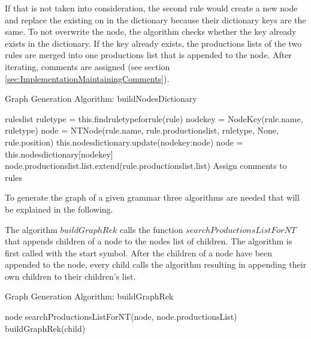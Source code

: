 If that is not taken into consideration, the second rule would create a new node and replace the existing on in the dictionary because their dictionary keys are the same. To not overwrite the node, the algorithm checks whether the key already exists in the dictionary. If the key already exists, the productions lists of the two rules are merged into one productions list that is appended to the node. 
After iterating, comments are assigned (see section \ref{sec:ImplementationMaintainingComments}).

\begin{algorithm}[H]
\caption{Graph Generation Algorithm: buildNodesDictionary}\label{alg:buildNodesDictionary}
\begin{algorithmic}[1] 
\Require rules\textunderscore list
		\State rule\textunderscore type = this.find\textunderscore rule\textunderscore type\textunderscore for\textunderscore rule(rule)
		\State node\textunderscore key = Node\textunderscore Key(rule.name, rule\textunderscore type)
			\State node = NTNode(rule.name, rule.productions\textunderscore list, rule\textunderscore type, None, rule.position)
			\State this.nodes\textunderscore dictionary.update({node\textunderscore key:node})
		\Else
			\State node = this.nodes\textunderscore dictionary[node\textunderscore key]
			\State node.productions\textunderscore list.list.extend(rule.productions\textunderscore list.list)
		\EndIf
	\EndIf
\EndFor
\State Assign comments to rules
\end{algorithmic}
\end{algorithm}

To generate the graph of a given grammar three algorithms are needed that will be explained in the following.

The algorithm $buildGraphRek$ calls the function $searchProductionsListForNT$ that appends children of a node to the nodes list of children.
The algorithm is first called with the start symbol.
After the children of a node have been appended to the node, every child calls the algorithm resulting in appending their own children to their children's list.

\begin{algorithm}[H]
\caption{Graph Generation Algorithm: buildGraphRek}
\begin{algorithmic}[1] 
\Require node
\State searchProductionsListForNT(node, node.productionsList)
		\State buildGraphRek(child)
	\EndFor
\EndIf
\end{algorithmic}
\end{algorithm}

